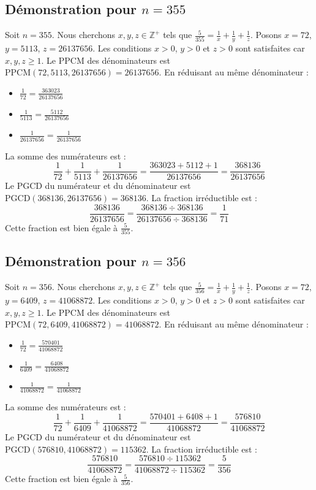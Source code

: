 \documentclass[11pt,a4paper]{article}
\begin{document}
\subsection{Démonstration pour $n = 355$}
Soit $n = 355$. Nous cherchons $x, y, z \in \mathbb{Z}^{+}$ tels que $\frac{5}{355} = \frac{1}{x} + \frac{1}{y} + \frac{1}{z}$.
Posons $x = 72$, $y = 5113$, $z = 26137656$.
Les conditions $x > 0$, $y > 0$ et $z > 0$ sont satisfaites car $x, y, z \geq 1$.
Le PPCM des dénominateurs est $\text{PPCM}(72, 5113, 26137656) = 26137656$.
En réduisant au même dénominateur :
\begin{itemize}
    \item $\frac{1}{72} = \frac{363023}{26137656}$
    \item $\frac{1}{5113} = \frac{5112}{26137656}$
    \item $\frac{1}{26137656} = \frac{1}{26137656}$
\end{itemize}
La somme des numérateurs est :
$$ \frac{1}{72} + \frac{1}{5113} + \frac{1}{26137656} = \frac{363023 + 5112 + 1}{26137656} = \frac{368136}{26137656} $$
Le PGCD du numérateur et du dénominateur est $\text{PGCD}(368136, 26137656) = 368136$.
La fraction irréductible est :
$$ \frac{368136}{26137656} = \frac{368136 \div 368136}{26137656 \div 368136} = \frac{1}{71} $$
Cette fraction est bien égale à $\frac{5}{355}$.

\subsection{Démonstration pour $n = 356$}
Soit $n = 356$. Nous cherchons $x, y, z \in \mathbb{Z}^{+}$ tels que $\frac{5}{356} = \frac{1}{x} + \frac{1}{y} + \frac{1}{z}$.
Posons $x = 72$, $y = 6409$, $z = 41068872$.
Les conditions $x > 0$, $y > 0$ et $z > 0$ sont satisfaites car $x, y, z \geq 1$.
Le PPCM des dénominateurs est $\text{PPCM}(72, 6409, 41068872) = 41068872$.
En réduisant au même dénominateur :
\begin{itemize}
    \item $\frac{1}{72} = \frac{570401}{41068872}$
    \item $\frac{1}{6409} = \frac{6408}{41068872}$
    \item $\frac{1}{41068872} = \frac{1}{41068872}$
\end{itemize}
La somme des numérateurs est :
$$ \frac{1}{72} + \frac{1}{6409} + \frac{1}{41068872} = \frac{570401 + 6408 + 1}{41068872} = \frac{576810}{41068872} $$
Le PGCD du numérateur et du dénominateur est $\text{PGCD}(576810, 41068872) = 115362$.
La fraction irréductible est :
$$ \frac{576810}{41068872} = \frac{576810 \div 115362}{41068872 \div 115362} = \frac{5}{356} $$
Cette fraction est bien égale à $\frac{5}{356}$.
\end{document}
